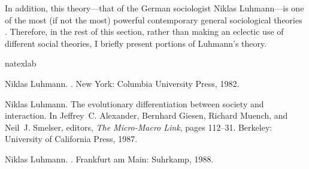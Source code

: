 \documentclass{article}
\begin{document}
In addition, this theory---that of the German sociologist Niklas
Luhmann---is one 
of the most (if not the most) powerful
contemporary general sociological theories
\citep{luhm:DoS,Luhm:Soc&int,luhm:WrtdG}.  Therefore, in the rest of
this section, rather than making an eclectic use of different social
theories, I briefly present portions of Luhmann's theory.

\begin{thebibliography}{3}
\expandafter\ifx\csname natexlab\endcsname\relax\def\natexlab#1{#1}\fi

Niklas Luhmann.
.
\newblock New York: Columbia University Press, 1982.

Niklas Luhmann.
\newblock The evolutionary differentiation between society and interaction.
\newblock In Jeffrey~C. Alexander, Bernhard Giesen, Richard Muench, and Neil~J.
  Smelser, editors, {\em The Micro-Macro Link}, pages 112--31. Berkeley:
  University of California Press, 1987.

Niklas Luhmann.
.
\newblock Frankfurt am Main: Suhrkamp, 1988.

\end{thebibliography}
\end{document}
